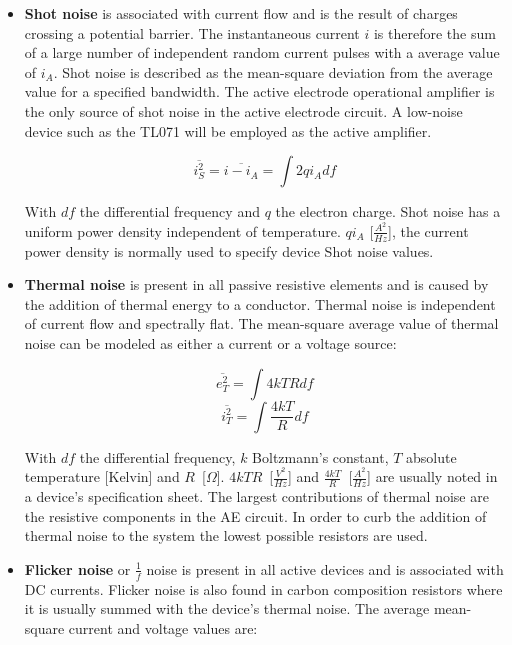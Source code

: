 \begin{itemize}
	\item\textbf{Shot noise} is associated with current flow and is
	the result of charges crossing a potential barrier. The
	instantaneous current $i$ is therefore the sum of a large number
	of independent random current pulses with a average value of
	$i_{A}$. Shot noise is described as the mean-square deviation from
	the average value for a specified bandwidth. The active electrode
	operational amplifier is the only source of shot noise in the
	active electrode circuit. A low-noise device such as the TL071
	will be employed as the active amplifier.

	\begin{equation}
		\overline{i_S^2} = \overline{i - i_A} = \int{2qi_Adf}
	\end{equation}

	With $df$ the differential frequency and $q$ the electron
	charge. Shot noise has a uniform power density independent of
	temperature. $qi_{A}$ [$\frac{A^2}{Hz}$], the current power
	density is normally used to specify device Shot noise values.

	\item\textbf{Thermal noise} is present in all passive resistive
	elements and is caused by the addition of thermal energy to a
	conductor. Thermal noise is independent of current flow and
	spectrally flat. The mean-square average value of thermal noise
	can be modeled as either a current or a voltage source:

	\begin{equation}
		\overline{e_T^2} = \int{4kTRdf}
		\label{eq:noise-thermal}
	\end{equation}
	\begin{equation}
		\overline{i_T^2} = \int{\frac{4kT}{R}df}
	\end{equation}

	With $df$ the differential frequency, $k$ Boltzmann's constant,
	$T$ absolute temperature [Kelvin] and
	$R$~[$\Omega$]. $4kTR$~[$\frac{V^2}{Hz}$] and
	$\frac{4kT}{R}$~[$\frac{A^2}{Hz}$] are usually noted in a device's
	specification sheet. The largest contributions of thermal noise
	are the resistive components in the AE circuit. In order to curb
	the addition of thermal noise to the system the lowest possible
	resistors are used.

	\item\textbf{Flicker noise} or $\frac{1}{f}$ noise is present in
	all active devices and is associated with DC currents. Flicker
	noise is also found in carbon composition resistors where it is
	usually summed with the device's thermal noise. The average
	mean-square current and voltage values are:
	

\end{itemize}
